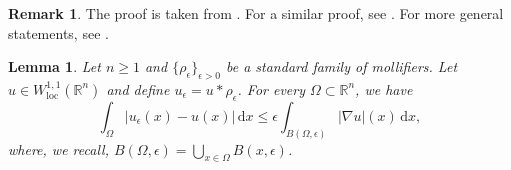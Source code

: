 \documentclass[a4paper,9pt]{amsart}
\newcommand{\R}{\mathbb{R}}	%
\newcommand{\did}{\,\mathrm{d}}	%
\newcommand{\loc}{\mathrm{loc}}
\newcommand{\grad}{\nabla}
\theoremstyle{plain}
\newtheorem{lemma}[proposition]{Lemma}
\theoremstyle{definition}
\newtheorem{remark}[proposition]{Remark}
\theoremstyle{remark}
\begin{document}
\begin{remark}
	The proof is taken from \cite[\S5.5.7]{MR2597943}.
	For a similar proof, see \cite[Theorem 4.26]{MR2759829}.
	For more general statements, see \cite[Theorem 6.3]{zbMATH02208228}.
\end{remark}

\begin{lemma}\label{lem681f714e}
	Let $n\ge1$ and $\{\rho_\epsilon\}_{\epsilon>0}$ be a standard family of mollifiers.
	Let $u\in W^{1,1}_\loc(\R^n)$ and define $u_\epsilon = u*\rho_\epsilon$.
	For every $\Omega\subset\R^n$, we have
	\begin{equation}\label{eq681f7158}
		\int_\Omega |u_\epsilon(x)-u(x)| \did x
		\le \epsilon \int_{B(\Omega,\epsilon)} |\grad u|(x) \did x ,
	\end{equation}
	where, we recall, $B(\Omega,\epsilon) = \bigcup_{x\in\Omega} B(x,\epsilon)$.
\end{lemma}
\end{document}
